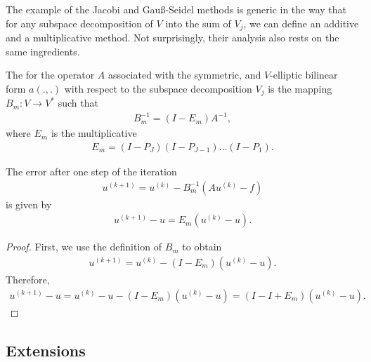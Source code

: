 \begin{intro}
  The example of the Jacobi and Gauß-Seidel methods is generic in the
  way that for any subspace decomposition of $V$ into the sum of
  $V_j$, we can define an additive and a multiplicative method. Not
  surprisingly, their analysis also rests on the same ingredients.
\end{intro}

\begin{definition}
  The  for the operator $A$ associated
  with the symmetric, and $V$-elliptic bilinear form $a(.,.)$ with
  respect to the subspace decomposition $V_j$ is the mapping $B_m:
  V \to V^*$ such that
  \begin{gather}
    \label{eq:schwarz:34}
    B_m^{-1} = (I -  E_m) A^{-1},
  \end{gather}
  where $E_m$ is the multiplicative 
  \begin{gather}
    \label{eq:schwarz:35}
    E_m = (I - P_J)(I - P_{J-1})\dots(I - P_1).
  \end{gather}
\end{definition}

\begin{lemma}
  The error after one step of the iteration
  \begin{gather*}
    u^{(k+1)} = u^{(k)} - B_m^{-1}\left(A u^{(k)} - f\right)
  \end{gather*}
  is given by
  \begin{gather*}
    u^{(k+1)} - u = E_m \left(u^{(k)} - u\right).
  \end{gather*}
\end{lemma}

\begin{proof}
  First, we use the definition of $B_m$ to obtain
  \begin{gather*}
    u^{(k+1)} = u^{(k)} - (I -  E_m) \left(u^{(k)} - u\right).
  \end{gather*}
  Therefore,
  \begin{gather*}
    u^{(k+1)} - u = u^{(k)} - u - (I -  E_m) \left(u^{(k)} - u\right)
    = (I-I+E_m) \left(u^{(k)} - u\right).
  \end{gather*}  
\end{proof}


\subsection{Extensions}

